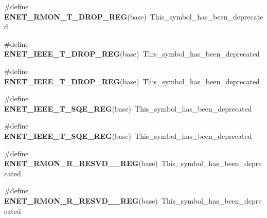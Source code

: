 \begin{DoxyCompactItemize}
\item 
\#define {\bfseries E\+N\+E\+T\+\_\+\+R\+M\+O\+N\+\_\+\+T\+\_\+\+D\+R\+O\+P\+\_\+\+R\+EG}(base)~This\+\_\+symbol\+\_\+has\+\_\+been\+\_\+deprecated\hypertarget{group__Backward__Compatibility__Symbols_ga4f954021c38e1312f369f2d506e849fb}{}\label{group__Backward__Compatibility__Symbols_ga4f954021c38e1312f369f2d506e849fb}

\item 
\#define {\bfseries E\+N\+E\+T\+\_\+\+I\+E\+E\+E\+\_\+\+T\+\_\+\+D\+R\+O\+P\+\_\+\+R\+EG}(base)~This\+\_\+symbol\+\_\+has\+\_\+been\+\_\+deprecated\hypertarget{group__Backward__Compatibility__Symbols_ga846ebd730ff995e90e8ef967f0d3190b}{}\label{group__Backward__Compatibility__Symbols_ga846ebd730ff995e90e8ef967f0d3190b}

\item 
\#define {\bfseries E\+N\+E\+T\+\_\+\+I\+E\+E\+E\+\_\+\+T\+\_\+\+D\+R\+O\+P\+\_\+\+R\+EG}(base)~This\+\_\+symbol\+\_\+has\+\_\+been\+\_\+deprecated\hypertarget{group__Backward__Compatibility__Symbols_ga846ebd730ff995e90e8ef967f0d3190b}{}\label{group__Backward__Compatibility__Symbols_ga846ebd730ff995e90e8ef967f0d3190b}

\item 
\#define {\bfseries E\+N\+E\+T\+\_\+\+I\+E\+E\+E\+\_\+\+T\+\_\+\+S\+Q\+E\+\_\+\+R\+EG}(base)~This\+\_\+symbol\+\_\+has\+\_\+been\+\_\+deprecated\hypertarget{group__Backward__Compatibility__Symbols_ga534c1bbf70fea82ca5a237985faa5ab9}{}\label{group__Backward__Compatibility__Symbols_ga534c1bbf70fea82ca5a237985faa5ab9}

\item 
\#define {\bfseries E\+N\+E\+T\+\_\+\+I\+E\+E\+E\+\_\+\+T\+\_\+\+S\+Q\+E\+\_\+\+R\+EG}(base)~This\+\_\+symbol\+\_\+has\+\_\+been\+\_\+deprecated\hypertarget{group__Backward__Compatibility__Symbols_ga534c1bbf70fea82ca5a237985faa5ab9}{}\label{group__Backward__Compatibility__Symbols_ga534c1bbf70fea82ca5a237985faa5ab9}

\item 
\#define {\bfseries E\+N\+E\+T\+\_\+\+R\+M\+O\+N\+\_\+\+R\+\_\+\+R\+E\+S\+V\+D\+\_\+\_\+\+R\+EG}(base)~This\+\_\+symbol\+\_\+has\+\_\+been\+\_\+deprecated\hypertarget{group__Backward__Compatibility__Symbols_ga911420e8f14b5d4711e0cec193358811}{}\label{group__Backward__Compatibility__Symbols_ga911420e8f14b5d4711e0cec193358811}

\item 
\#define {\bfseries E\+N\+E\+T\+\_\+\+R\+M\+O\+N\+\_\+\+R\+\_\+\+R\+E\+S\+V\+D\+\_\+\_\+\+R\+EG}(base)~This\+\_\+symbol\+\_\+has\+\_\+been\+\_\+deprecated\hypertarget{group__Backward__Compatibility__Symbols_ga911420e8f14b5d4711e0cec193358811}{}\label{group__Backward__Compatibility__Symbols_ga911420e8f14b5d4711e0cec193358811}


\end{DoxyCompactItemize}

